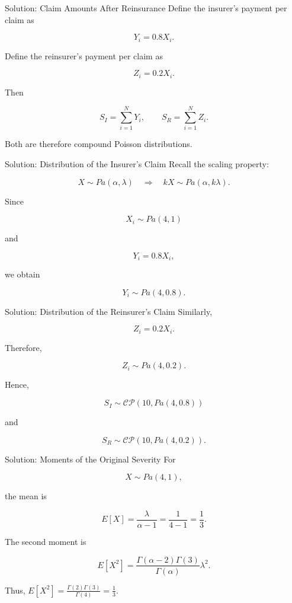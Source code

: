 \documentclass[
  ignorenonframetext,
  aspectratio=169,
]{beamer}
\begin{document}
\begin{frame}{Solution: Claim Amounts After Reinsurance}
\protect{}\label{solution-claim-amounts-after-reinsurance}
Define the insurer's payment per claim as

\[
Y_i=0.8X_i.
\]

Define the reinsurer's payment per claim as

\[
Z_i=0.2X_i.
\]

Then

\[
S_I=\sum_{i=1}^{N}Y_i,
\qquad
S_R=\sum_{i=1}^{N}Z_i.
\]

Both are therefore compound Poisson distributions.
\end{frame}

\begin{frame}{Solution: Distribution of the Insurer's Claim}
\protect{}\label{solution-distribution-of-the-insurers-claim}
Recall the scaling property:

\[
X\sim Pa(\alpha,\lambda)
\quad\Longrightarrow\quad
kX\sim Pa(\alpha,k\lambda).
\]

Since

\[
X_i\sim Pa(4,1)
\]

and

\[
Y_i=0.8X_i,
\]

we obtain

\[
\boxed{Y_i\sim Pa(4,0.8)}.
\]
\end{frame}

\begin{frame}{Solution: Distribution of the Reinsurer's Claim}
\protect{}\label{solution-distribution-of-the-reinsurers-claim}
Similarly,

\[
Z_i=0.2X_i.
\]

Therefore,

\[
\boxed{Z_i\sim Pa(4,0.2)}.
\]

Hence,

\[
\boxed{
S_I\sim\mathcal{CP}(10,Pa(4,0.8))
}
\]

and

\[
\boxed{
S_R\sim\mathcal{CP}(10,Pa(4,0.2))
}.
\]
\end{frame}

\begin{frame}{Solution: Moments of the Original Severity}
\protect{}\label{solution-moments-of-the-original-severity}
For

\[
X\sim Pa(4,1),
\]

the mean is

\[
E[X]=\frac{\lambda}{\alpha-1}
=\frac{1}{4-1}
=\frac{1}{3}.
\]

The second moment is

\[
E[X^2]
=
\frac{\Gamma(\alpha-2)\Gamma(3)}
{\Gamma(\alpha)}
\lambda^2.
\]

Thus, \(E[X^2]=\frac{\Gamma(2)\Gamma(3)}{\Gamma(4)}=\frac{1}{3}.\)
\end{frame}
\end{document}
